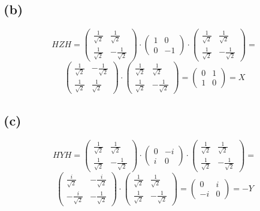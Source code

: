 \documentclass{article}
\begin{document}
\subsection*{(b)}

$$HZH=
\begin{pmatrix}
\frac{1}{\sqrt{2}} & \frac{1}{\sqrt{2}} \\
\frac{1}{\sqrt{2}} & -\frac{1}{\sqrt{2}}
\end{pmatrix}\cdot 
\begin{pmatrix}
1 & 0 \\
0 & -1
\end{pmatrix}\cdot
\begin{pmatrix}
\frac{1}{\sqrt{2}} & \frac{1}{\sqrt{2}} \\
\frac{1}{\sqrt{2}} & -\frac{1}{\sqrt{2}}
\end{pmatrix}=
$$
$$
\begin{pmatrix}
\frac{1}{\sqrt{2}} & -\frac{1}{\sqrt{2}} \\
\frac{1}{\sqrt{2}} & \frac{1}{\sqrt{2}}
\end{pmatrix}\cdot
\begin{pmatrix}
\frac{1}{\sqrt{2}} & \frac{1}{\sqrt{2}} \\
\frac{1}{\sqrt{2}} & -\frac{1}{\sqrt{2}}
\end{pmatrix}=
\begin{pmatrix}
0 & 1 \\
1 & 0
\end{pmatrix}=X
$$

\subsection*{(c)}

$$HYH=
\begin{pmatrix}
\frac{1}{\sqrt{2}} & \frac{1}{\sqrt{2}} \\
\frac{1}{\sqrt{2}} & -\frac{1}{\sqrt{2}}
\end{pmatrix}\cdot 
\begin{pmatrix}
0 & -i \\
i & 0
\end{pmatrix}\cdot
\begin{pmatrix}
\frac{1}{\sqrt{2}} & \frac{1}{\sqrt{2}} \\
\frac{1}{\sqrt{2}} & -\frac{1}{\sqrt{2}}
\end{pmatrix}=
$$
$$
\begin{pmatrix}
\frac{i}{\sqrt{2}} & -\frac{i}{\sqrt{2}} \\
-\frac{i}{\sqrt{2}} & -\frac{1}{\sqrt{2}}
\end{pmatrix}\cdot
\begin{pmatrix}
\frac{1}{\sqrt{2}} & \frac{1}{\sqrt{2}} \\
\frac{1}{\sqrt{2}} & -\frac{1}{\sqrt{2}}
\end{pmatrix}=
\begin{pmatrix}
0 & i \\
-i & 0
\end{pmatrix}=-Y
$$
\end{document}
